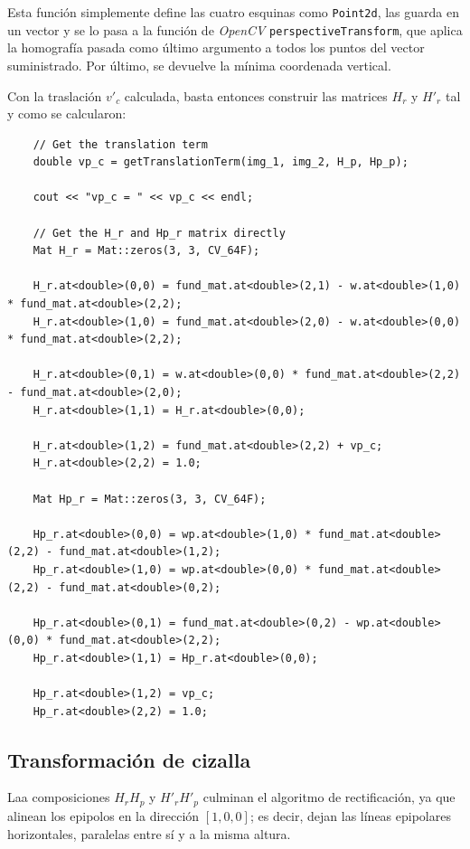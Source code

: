\documentclass[a4paper, 11pt]{article}
\theoremstyle{definition}
\begin{document}
    Esta función simplemente define las cuatro esquinas como \lstinline{Point2d}, las guarda en un vector y se lo pasa a la función de \emph{OpenCV} \lstinline{perspectiveTransform}, que aplica la homografía pasada como último argumento a todos los puntos del vector suministrado. Por último, se devuelve la mínima coordenada vertical.

    Con la traslación $v'_c$ calculada, basta entonces construir las matrices $H_r$ y $H'_r$ tal y como se calcularon:
    \begin{lstlisting}
    // Get the translation term
    double vp_c = getTranslationTerm(img_1, img_2, H_p, Hp_p);

    cout << "vp_c = " << vp_c << endl;

    // Get the H_r and Hp_r matrix directly
    Mat H_r = Mat::zeros(3, 3, CV_64F);

    H_r.at<double>(0,0) = fund_mat.at<double>(2,1) - w.at<double>(1,0) * fund_mat.at<double>(2,2);
    H_r.at<double>(1,0) = fund_mat.at<double>(2,0) - w.at<double>(0,0) * fund_mat.at<double>(2,2);

    H_r.at<double>(0,1) = w.at<double>(0,0) * fund_mat.at<double>(2,2) - fund_mat.at<double>(2,0);
    H_r.at<double>(1,1) = H_r.at<double>(0,0);

    H_r.at<double>(1,2) = fund_mat.at<double>(2,2) + vp_c;
    H_r.at<double>(2,2) = 1.0;

    Mat Hp_r = Mat::zeros(3, 3, CV_64F);

    Hp_r.at<double>(0,0) = wp.at<double>(1,0) * fund_mat.at<double>(2,2) - fund_mat.at<double>(1,2);
    Hp_r.at<double>(1,0) = wp.at<double>(0,0) * fund_mat.at<double>(2,2) - fund_mat.at<double>(0,2);

    Hp_r.at<double>(0,1) = fund_mat.at<double>(0,2) - wp.at<double>(0,0) * fund_mat.at<double>(2,2);
    Hp_r.at<double>(1,1) = Hp_r.at<double>(0,0);

    Hp_r.at<double>(1,2) = vp_c;
    Hp_r.at<double>(2,2) = 1.0;
    \end{lstlisting}

    \subsection{Transformación de cizalla}
    Laa composiciones $H_r H_p$ y $H'_r H'_p$ culminan el algoritmo de rectificación, ya que alinean los epipolos en la dirección $[1, 0, 0]$; es decir, dejan las líneas epipolares horizontales, paralelas entre sí y a la misma altura.
\end{document}
